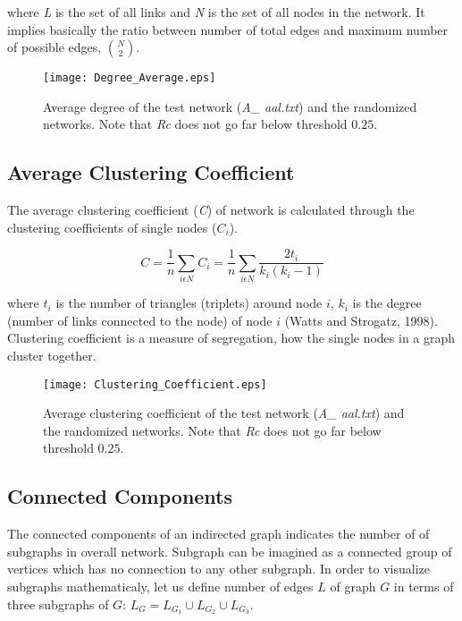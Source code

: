 \documentclass[12pt]{article}
\begin{document}
where \textit{L} is the set of all links and \textit{N} is the set of all nodes in the network. It implies basically the ratio between number of total edges and maximum number of possible edges, ${N \choose 2} $.
	
\begin{figure}[h!]
	
	\centering
	\texttt{[image: Degree\_Average.eps]}
	\caption{Average degree of the test network (\textit{A\_ aal.txt}) and the randomized networks. Note that \textit{Rc} does not go far below threshold $0.25$.}
\end{figure}
	
\subsection{Average Clustering Coefficient}

The average clustering coefficient (\textit{C}) of network is calculated through the clustering coefficients of single nodes ($C_i$).

\begin{equation}
C = \frac{1}{n} \sum\limits_{i\epsilon N}C_i = \frac{1}{n}\sum\limits_{i\epsilon N} \frac{2t_i}{k_i(k_i -1)}
\end{equation} 

where $t_i$ is the number of triangles (triplets) around node $i$, $k_i$ is the degree (number of links connected to the node) of node $i$ (Watts and Strogatz, 1998). Clustering coefficient is a measure of segregation, how the single nodes in a graph cluster together.	

\begin{figure}[h!]
	
	\centering
	\texttt{[image: Clustering\_Coefficient.eps]}
	\caption{Average clustering coefficient of the test network (\textit{A\_ aal.txt}) and the randomized networks. Note that \textit{Rc} does not go far below threshold $0.25$.}
\end{figure}

\newpage

\subsection{Connected Components}

The connected components of an indirected graph indicates the number of of subgraphs in overall network. Subgraph can be imagined as a connected group of vertices which has no connection to any other subgraph. In order to visualize subgraphs mathematicaly, let us define number of edges $L$ of graph $G$ in terms of three subgraphs of $G$: $L_G = L_{G_1}\cup L_{G_2}\cup L_{G_3}$. 
\end{document}
